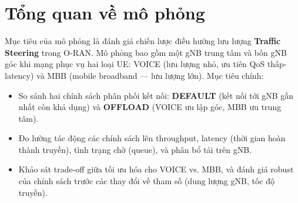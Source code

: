 \section{Tổng quan về mô phỏng}

Mục tiêu của mô phỏng là đánh giá chiến lược điều hướng lưu lượng \textbf{Traffic Steering} trong O-RAN. Mô phỏng bao gồm một gNB trung tâm và bốn gNB góc khi mạng phục vụ hai loại UE: VOICE (lưu lượng nhỏ, ưu tiên QoS thấp-latency) và MBB (mobile broadband — lưu lượng lớn). Mục tiêu chính:

\begin{itemize}
\item So sánh hai chính sách phân phối kết nối: \textbf{DEFAULT} (kết nối tới gNB gần nhất còn khả dụng) và \textbf{OFFLOAD} (VOICE ưu lập góc, MBB ưu trung tâm).
\item Đo lường tác động các chính sách lên throughput, latency (thời gian hoàn thành truyền), tình trạng chờ (queue), và phân bổ tải trên gNB.
\item Khảo sát trade-off giữa tối ưu hóa cho VOICE vs. MBB, và đánh giá robust của chính sách trước các thay đổi về tham số (dung lượng gNB, tốc độ truyền).
\end{itemize}